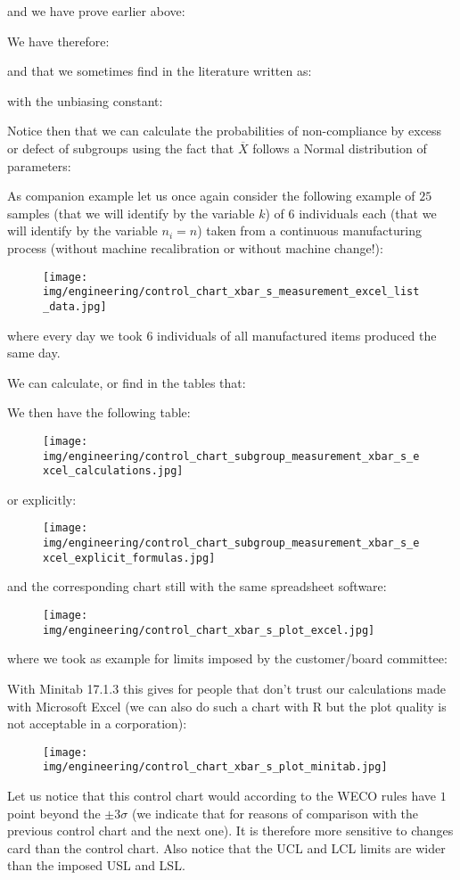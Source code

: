 	and we have prove earlier above:
	
	We have therefore:
	
	and that we sometimes find in the literature written as:
	
	with the unbiasing constant:
	
	Notice then that we can calculate the probabilities of non-compliance by excess or defect of subgroups using the fact that $\overline{X}$ follows a Normal distribution of parameters:
	
	As companion example let us once again consider the following example of $25$ samples (that we will identify by the variable $k$) of $6$ individuals each (that we will identify by the variable $n_i=n$) taken from a continuous manufacturing process (without machine recalibration or without machine change!):
 	\begin{figure}[H]
		\centering
		\texttt{[image: img/engineering/control\_chart\_xbar\_s\_measurement\_excel\_list\_data.jpg]}
	\end{figure}
	where every day we took $6$ individuals of all manufactured items produced the same day.
	
	We can calculate, or find in the tables that:
	
	We then have the following table:
	\begin{figure}[H]
		\centering
		\texttt{[image: img/engineering/control\_chart\_subgroup\_measurement\_xbar\_s\_excel\_calculations.jpg]}
	\end{figure}
	or explicitly:
	\begin{figure}[H]
		\centering
		\texttt{[image: img/engineering/control\_chart\_subgroup\_measurement\_xbar\_s\_excel\_explicit\_formulas.jpg]}
	\end{figure}
	and the corresponding chart still with the same spreadsheet software:
	\begin{figure}[H]
		\centering
		\texttt{[image: img/engineering/control\_chart\_xbar\_s\_plot\_excel.jpg]}
	\end{figure}
	where we took as example for limits imposed by the customer/board committee:
	
	With Minitab 17.1.3 this gives for people that don't trust our calculations made with Microsoft Excel (we can also do such a chart with R but the plot quality is not acceptable in a corporation):
	\begin{figure}[H]
		\centering
		\texttt{[image: img/engineering/control\_chart\_xbar\_s\_plot\_minitab.jpg]}
	\end{figure}
	Let us notice that this control chart would according to the WECO rules have $1$ point beyond the $\pm 3\sigma$ (we indicate that for reasons of comparison with the previous control chart and the next one). It is therefore more sensitive to changes card than the control chart. Also notice that the UCL and LCL limits are wider than the imposed USL and LSL.
	
